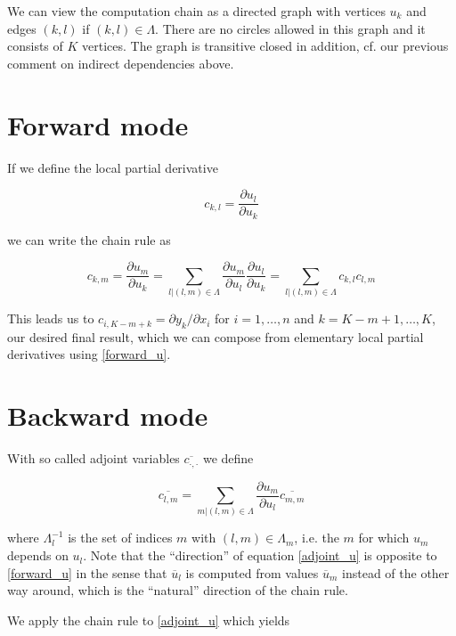 \documentclass{amsart}
\theoremstyle{plain}
\numberwithin{equation}{section}
\begin{document}
We can view the computation chain as a directed graph with vertices $u_k$ and edges $(k,l)$ if $(k,l)\in\Lambda$. There are no circles allowed in this graph and it consists of $K$ vertices. The graph is transitive closed in addition, cf. our previous comment on indirect dependencies above.

\section{Forward mode}

If we define the local partial derivative

\begin{equation}
c_{k,l} = \frac{\partial u_l}{\partial u_k}
\end{equation}

we can write the chain rule as

\begin{equation}\label{forward_u}
c_{k,m} = \frac{\partial u_m}{\partial u_k} = \sum_{l|(l,m)\in\Lambda} \frac{\partial u_m}{\partial u_l} \frac{\partial u_l}{\partial u_k} = \sum_{l|(l,m)\in\Lambda} c_{k,l}c_{l,m}
\end{equation}

This leads us to $c_{i,K-m+k} = \partial{y_k} / \partial{x_i}$ for $i=1,\dots,n$ and $k=K-m+1,\dots,K$, our desired final result, which we can compose from elementary local partial derivatives using \ref{forward_u}.

\section{Backward mode}

With so called adjoint variables $\overline{c_{\cdot,\cdot}}$ we define

\begin{equation}\label{adjoint_u}
\overline{c_{l,m}} = \sum_{m|(l,m)\in\Lambda} \frac{\partial u_m}{\partial u_l} \overline{c_{m,m}} 
\end{equation}

where $\Lambda^{-1}_l$ is the set of indices $m$ with $(l,m)\in\Lambda_m$, i.e. the $m$ for which $u_m$ depends on $u_l$. Note that the ``direction'' of equation \ref{adjoint_u} is opposite to \ref{forward_u} in the sense that $\overline{u}_l$ is computed from values $\overline{u}_m$ instead of the other way around, which is the ``natural'' direction of the chain rule.

We apply the chain rule to \ref{adjoint_u} which yields
\end{document}
